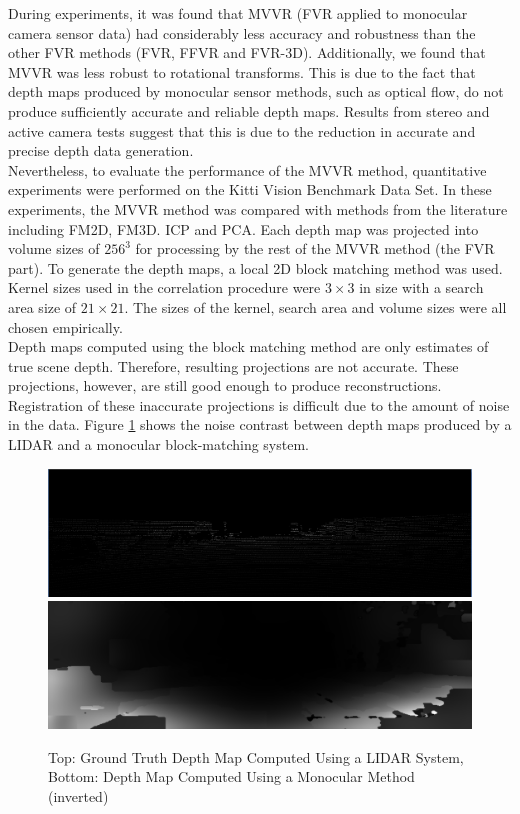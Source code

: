 
During experiments, it was found that MVVR (FVR applied to monocular camera sensor data) had considerably less accuracy and robustness than the other FVR methods (FVR, FFVR and FVR-3D). Additionally, we found that MVVR was less robust to rotational transforms. This is due to the fact that depth maps produced by monocular sensor methods, such as optical flow, do not produce sufficiently accurate and reliable depth maps. Results from stereo and active camera tests suggest that this is due to the reduction in accurate and precise depth data generation. \\

Nevertheless, to evaluate the performance of the MVVR method, quantitative experiments were performed on the Kitti Vision Benchmark Data Set. In these experiments, the MVVR method was compared with methods from the literature including FM2D, FM3D. ICP and PCA. Each depth map was projected into volume sizes of $256^3$ for processing by the rest of the MVVR method (the FVR part). To generate the depth maps, a local 2D block matching method was used. Kernel sizes used in the correlation procedure were $3 \times 3$ in size with a search area size of $21 \times 21$. The sizes of the kernel, search area and volume sizes were all chosen empirically. \\

Depth maps computed using the block matching method are only estimates of true scene depth. Therefore, resulting projections are not accurate. These projections, however, are still good enough to produce reconstructions. Registration of these inaccurate projections is difficult due to the amount of noise in the data. Figure \ref{fig:lidarVSMono} shows the noise contrast between depth maps produced by a LIDAR and a monocular block-matching system. \\

\begin{figure}[!htb]
\centering
\includegraphics[width=4.5in]{images/methodology/FVR/mono/color}
\includegraphics[width=4.5in]{images/methodology/FVR/mono/depth}
\caption{Top: Ground Truth Depth Map Computed Using a LIDAR System, Bottom: Depth Map Computed Using a Monocular Method (inverted)}
\label{fig:lidarVSMono}
\end{figure}


